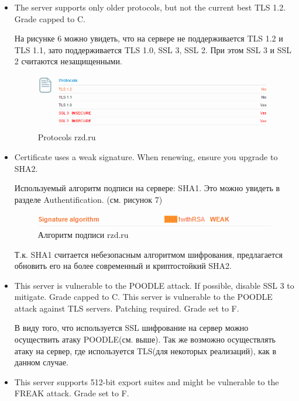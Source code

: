 \documentclass[11pt, a4paper]{article}		%
\begin{document}
\begin{itemize}

\item The server supports only older protocols, but not the current best TLS 1.2. Grade capped to C.

На рисунке 6 можно увидеть, что на сервере не поддерживается TLS 1.2 и TLS 1.1, зато поддерживается TLS 1.0, SSL 3, SSL 2.
При этом SSL 3 и SSL 2 считаются незащищенными.

\begin{figure}[h!]
\centering
\includegraphics[scale=0.8]{res/6}
\caption{Protocols rzd.ru}
\end{figure}

\item Certificate uses a weak signature. When renewing, ensure you upgrade to SHA2.

Используемый алгоритм подписи на сервере: SHA1. Это можно увидеть в разделе Authentification. (см. рисунок 7)

\begin{figure}[h!]
\centering
\includegraphics[scale=0.8]{res/7}
\caption{Алгоритм подписи rzd.ru}
\end{figure}

Т.к. SHA1 считается небезопасным алгоритмом шифрования, предлагается обновить его на более современный и криптостойкий SHA2. 

\item This server is vulnerable to the POODLE attack. If possible, disable SSL 3 to mitigate. Grade capped to C. This server is vulnerable to the POODLE attack against TLS servers. Patching required. Grade set to F.

В виду того, что используется SSL шифрование на сервер можно осуществить атаку POODLE(см. выше). Так же возможно осуществлять атаку на сервер, где используется TLS(для некоторых реализаций), как в данном случае.

\item This server supports 512-bit export suites and might be vulnerable to the FREAK attack. Grade set to F.


\end{itemize}
\end{document}
